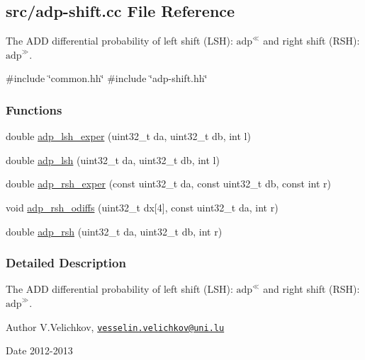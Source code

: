 \hypertarget{adp-shift_8cc}{\subsection{src/adp-\/shift.cc \-File \-Reference}
\label{adp-shift_8cc}
}


\-The \-A\-D\-D differential probability of left shift (\-L\-S\-H)\-: $\mathrm{adp}^{\ll}$ and right shift (\-R\-S\-H)\-: $\mathrm{adp}^{\gg}$.  


{\ttfamily \#include \char`\"{}common.\-hh\char`\"{}}\*
{\ttfamily \#include \char`\"{}adp-\/shift.\-hh\char`\"{}}\*
\subsubsection*{\-Functions}
\begin{DoxyCompactItemize}
\item 
double \hyperlink{adp-shift_8cc_a862d37a2421ed62045358ce6e9bb9dcb}{adp\-\_\-lsh\-\_\-exper} (uint32\-\_\-t da, uint32\-\_\-t db, int l)
\item 
double \hyperlink{adp-shift_8cc_a48f94900b0d370c44ef16256310d073f}{adp\-\_\-lsh} (uint32\-\_\-t da, uint32\-\_\-t db, int l)
\item 
double \hyperlink{adp-shift_8cc_a6a874c5f39e73547bf93fb1356e6e580}{adp\-\_\-rsh\-\_\-exper} (const uint32\-\_\-t da, const uint32\-\_\-t db, const int r)
\item 
void \hyperlink{adp-shift_8cc_aa68814fb7eac34b923f42cfa1445a6b1}{adp\-\_\-rsh\-\_\-odiffs} (uint32\-\_\-t dx\mbox{[}4\mbox{]}, const uint32\-\_\-t da, int r)
\item 
double \hyperlink{adp-shift_8cc_a06fffd781af6662482922889bc562caf}{adp\-\_\-rsh} (uint32\-\_\-t da, uint32\-\_\-t db, int r)
\end{DoxyCompactItemize}


\subsubsection{\-Detailed \-Description}
\-The \-A\-D\-D differential probability of left shift (\-L\-S\-H)\-: $\mathrm{adp}^{\ll}$ and right shift (\-R\-S\-H)\-: $\mathrm{adp}^{\gg}$. \begin{DoxyAuthor}{\-Author}
\-V.\-Velichkov, \href{mailto:vesselin.velichkov@uni.lu}{\tt vesselin.\-velichkov@uni.\-lu} 
\end{DoxyAuthor}
\begin{DoxyDate}{\-Date}
2012-\/2013 
\end{DoxyDate}


